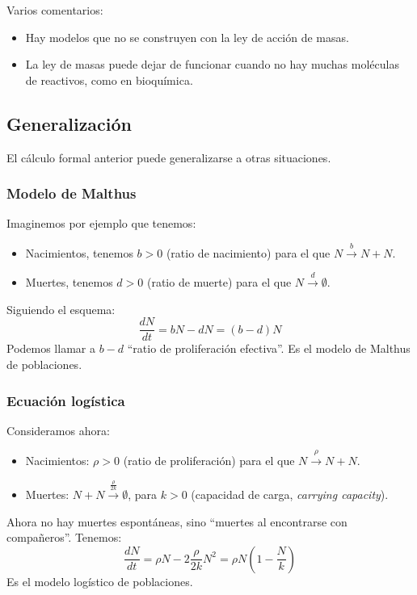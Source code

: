 \noindent
Varios comentarios:
\begin{itemize}
    \item Hay modelos que no se construyen con la ley de acción de masas.
    \item La ley de masas puede dejar de funcionar cuando no hay muchas moléculas de reactivos, como en bioquímica.
\end{itemize}

\subsection{Generalización}
\noindent
El cálculo formal anterior puede generalizarse a otras situaciones. 

\subsubsection{Modelo de Malthus}
\noindent
Imaginemos por ejemplo que tenemos:
\begin{itemize}
    \item Nacimientos, tenemos $b>0$ (ratio de nacimiento) para el que $N\stackrel{b}{\longrightarrow} N+N$.
    \item Muertes, tenemos $d>0$ (ratio de muerte) para el que $N\stackrel{d}{\longrightarrow}\emptyset $.
\end{itemize}
Siguiendo el esquema:
\begin{equation*}
    \frac{dN}{dt} = bN -dN = (b-d)N
\end{equation*}
Podemos llamar a $b-d$ ``ratio de proliferación efectiva''. Es el modelo de Malthus de poblaciones.

\subsubsection{Ecuación logística}
\noindent
Consideramos ahora:
\begin{itemize}
    \item Nacimientos: $\rho>0$ (ratio de proliferación) para el que $N\stackrel{\rho}{\longrightarrow} N+N$.
    \item Muertes: $N+N\stackrel{\frac{\rho}{2k}}{\longrightarrow}\emptyset $, para $k>0$ (capacidad de carga, \textit{carrying capacity}).
\end{itemize}
Ahora no hay muertes espontáneas, sino ``muertes al encontrarse con compañeros''. Tenemos:
\begin{equation*}
    \frac{dN}{dt} = \rho N - 2\frac{\rho}{2k}N^2 = \rho N\left(1-\frac{N}{k}\right)
\end{equation*}
Es el modelo logístico de poblaciones.\\

